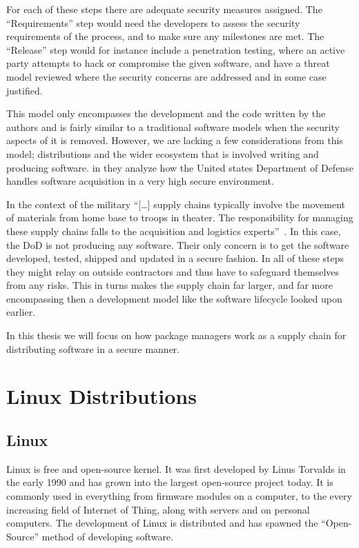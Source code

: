\documentclass[../Main/thesis.tex]{subfiles}
\begin{document}
For each of these steps there are adequate security measures assigned. The
``Requirements'' step would need the developers to assess the security
requirements of the process, and to make sure any milestones are met. The
``Release'' step would for instance include a penetration testing, where an
active party attempts to hack or compromise the given software, and have a
threat model reviewed where the security concerns are addressed and in some case
justified.

This model only encompasses the development and the code written by the authors
and is fairly similar to a traditional software models when the security aspects
of it is removed. However, we are lacking a few considerations from this model;
distributions and the wider ecosystem that is involved writing and producing
software. \citeauthor{rj-ellison-2010} in  they
analyze how the United states Department of Defense handles software acquisition
in a very high secure environment. 


In the context of the military ``[\dots] supply chains typically
involve the movement of materials from home base to troops in theater. The
responsibility for managing these supply chains falls to the acquisition and
logistics experts''~\cite{rj-ellison-2010}. In this case, the DoD is not
producing any software. Their only concern is to get the software developed,
tested, shipped and updated in a secure fashion. In all of these steps they
might relay on outside contractors and thus have to safeguard themselves from
any risks. This in turns makes the supply chain far larger, and far more
encompassing then a development model like the software lifecycle looked upon
earlier.

In this thesis we will focus on how package managers work as a supply chain for
distributing software in a secure manner.

\section{Linux Distributions}\label{sec:linux_distributions}
\subsection*{Linux}
Linux is free and open-source kernel. It was first developed by Linus Torvalds
in the early 1990 and has grown into the largest open-source project today. It
is commonly used in everything from firmware modules on a computer, to the every
increasing field of Internet of Thing, along with servers and on personal
computers. The development of Linux is distributed and has spawned the
``Open-Source'' method of developing software.
\end{document}
